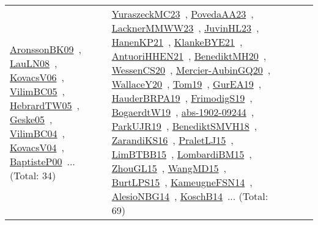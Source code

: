 {\begin{longtable}{lp{3cm}>{\raggedright\arraybackslash}p{6cm}>{\raggedright\arraybackslash}p{6cm}>{\raggedright\arraybackslash}p{8cm}}
\href{papers/AronssonBK09.pdf}{AronssonBK09}~\cite{AronssonBK09}, \href{papers/LauLN08.pdf}{LauLN08}~\cite{LauLN08}, \href{papers/KovacsV06.pdf}{KovacsV06}~\cite{KovacsV06}, \href{articles/VilimBC05.pdf}{VilimBC05}~\cite{VilimBC05}, \href{papers/HebrardTW05.pdf}{HebrardTW05}~\cite{HebrardTW05}, \href{papers/Geske05.pdf}{Geske05}~\cite{Geske05}, \href{papers/VilimBC04.pdf}{VilimBC04}~\cite{VilimBC04}, \href{papers/KovacsV04.pdf}{KovacsV04}~\cite{KovacsV04}, \href{articles/BaptisteP00.pdf}{BaptisteP00}~\cite{BaptisteP00}... (Total: 34) & \href{papers/YuraszeckMC23.pdf}{YuraszeckMC23}~\cite{YuraszeckMC23}, \href{papers/PovedaAA23.pdf}{PovedaAA23}~\cite{PovedaAA23}, \href{articles/LacknerMMWW23.pdf}{LacknerMMWW23}~\cite{LacknerMMWW23}, \href{papers/JuvinHL23.pdf}{JuvinHL23}~\cite{JuvinHL23}, \href{papers/HanenKP21.pdf}{HanenKP21}~\cite{HanenKP21}, \href{papers/KlankeBYE21.pdf}{KlankeBYE21}~\cite{KlankeBYE21}, \href{papers/AntuoriHHEN21.pdf}{AntuoriHHEN21}~\cite{AntuoriHHEN21}, \href{articles/BenediktMH20.pdf}{BenediktMH20}~\cite{BenediktMH20}, \href{papers/WessenCS20.pdf}{WessenCS20}~\cite{WessenCS20}, \href{papers/Mercier-AubinGQ20.pdf}{Mercier-AubinGQ20}~\cite{Mercier-AubinGQ20}, \href{articles/WallaceY20.pdf}{WallaceY20}~\cite{WallaceY20}, \href{papers/Tom19.pdf}{Tom19}~\cite{Tom19}, \href{articles/GurEA19.pdf}{GurEA19}~\cite{GurEA19}, \href{articles/HauderBRPA19.pdf}{HauderBRPA19}~\cite{HauderBRPA19}, \href{papers/FrimodigS19.pdf}{FrimodigS19}~\cite{FrimodigS19}, \href{papers/BogaerdtW19.pdf}{BogaerdtW19}~\cite{BogaerdtW19}, \href{articles/abs-1902-09244.pdf}{abs-1902-09244}~\cite{abs-1902-09244}, \href{papers/ParkUJR19.pdf}{ParkUJR19}~\cite{ParkUJR19}, \href{papers/BenediktSMVH18.pdf}{BenediktSMVH18}~\cite{BenediktSMVH18}, \href{articles/ZarandiKS16.pdf}{ZarandiKS16}~\cite{ZarandiKS16}, \href{papers/PraletLJ15.pdf}{PraletLJ15}~\cite{PraletLJ15}, \href{papers/LimBTBB15.pdf}{LimBTBB15}~\cite{LimBTBB15}, \href{papers/LombardiBM15.pdf}{LombardiBM15}~\cite{LombardiBM15}, \href{papers/ZhouGL15.pdf}{ZhouGL15}~\cite{ZhouGL15}, \href{articles/WangMD15.pdf}{WangMD15}~\cite{WangMD15}, \href{papers/BurtLPS15.pdf}{BurtLPS15}~\cite{BurtLPS15}, \href{articles/KameugneFSN14.pdf}{KameugneFSN14}~\cite{KameugneFSN14}, \href{papers/AlesioNBG14.pdf}{AlesioNBG14}~\cite{AlesioNBG14}, \href{papers/KoschB14.pdf}{KoschB14}~\cite{KoschB14}... (Total: 69)\\

\end{longtable}}
